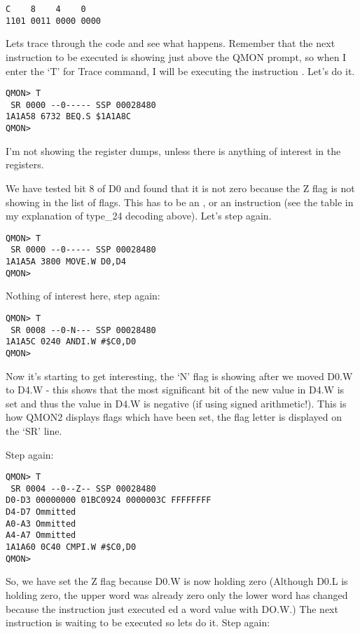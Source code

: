 \begin{appendix}
\begin{lstlisting}[frame=none,numbers=none,]
   C    8    4    0
1101 0011 0000 0000
\end{lstlisting}

Lets trace through the code and see what happens. Remember that the next
instruction to be executed is showing just above the QMON prompt, so when I
enter the `T' for Trace command, I will be executing the instruction . Let's do it.

\begin{lstlisting}[frame=none,numbers=none,]
QMON> T
 SR 0000 --0----- SSP 00028480
1A1A58 6732 BEQ.S $1A1A8C
QMON>
\end{lstlisting}

I'm not showing the register dumps, unless there is anything of interest in the
registers.

We have tested bit 8 of D0 and found that it is not zero because the Z flag is
not showing in the list of flags. This has to be an ,  or an 
instruction (see the table in my explanation of type\_24 decoding above). Let's
step again.

\begin{lstlisting}[frame=none,numbers=none,]
QMON> T
 SR 0000 --0----- SSP 00028480
1A1A5A 3800 MOVE.W D0,D4
QMON>
\end{lstlisting}

Nothing of interest here, step again:

\begin{lstlisting}[frame=none,numbers=none,]
QMON> T
 SR 0008 --0-N--- SSP 00028480
1A1A5C 0240 ANDI.W #$C0,D0
QMON>
\end{lstlisting}

Now it's starting to get interesting, the `N' flag is showing after we moved
D0.W to D4.W -{} this shows that the most significant bit of the new value in D4.W
is set and thus the value in D4.W is negative (if using signed arithmetic!).
This is how QMON2 displays flags which have been set, the flag letter is
displayed on the `SR' line.

Step again:

\begin{lstlisting}[frame=none,numbers=none,]
QMON> T
 SR 0004 --0--Z-- SSP 00028480
D0-D3 00000000 01BC0924 0000003C FFFFFFFF
D4-D7 Ommitted
A0-A3 Ommitted
A4-A7 Ommitted
1A1A60 0C40 CMPI.W #$C0,D0
QMON>
\end{lstlisting}

So, we have set the Z flag because D0.W is now holding zero (Although D0.L is
holding zero, the upper word was already zero only the lower word has changed
because the instruction just executed ed a word value with DO.W.) The next
instruction is waiting to be executed so lets do it. Step again:


\end{appendix}
